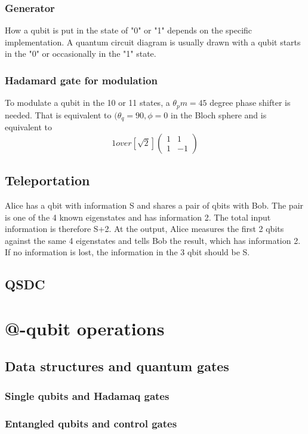 \documentclass{book}
\begin{document}
\subsection{Generator}
How a qubit is put in the state of "0" or "1" depends on the specific implementation. A quantum circuit diagram is usually drawn with a qubit starts in the "0" or occasionally in the "1" state.

\subsection{Hadamard gate for modulation}
To modulate a qubit in the 10 or 11 states, a $\theta_pm = 45$ degree phase shifter is needed. That is equivalent to $(\theta_q =90, \phi=0$ in the Bloch sphere and is equivalent to
\begin{equation}
    1 over [\sqrt 2]
    \begin{pmatrix}
1 & 1 \\
1 & -1
\end{pmatrix}
\end{equation}

\section{Teleportation}
Alice has a qbit with information S and shares a pair of qbits with Bob. The pair is one of the 4 known eigenstates and has information 2. The total input information is therefore S+2. At the output, Alice measures the first 2 qbits against the same 4 eigenstates and tells Bob the result, which has information 2. If no information is lost, the information in the 3 qbit should be S.

\section{QSDC}

\chapter{@-qubit operations}
\section{Data structures and quantum gates}
\subsection{Single qubits and Hadamaq gates}
\subsection{Entangled qubits and control gates}
\end{document}

